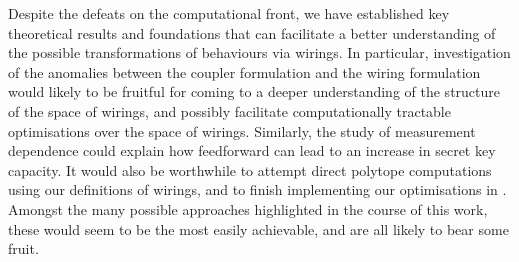 \documentclass[10pt, a4paper]{article}
\numberwithin{equation}{section} %
\theoremstyle{definition}
\theoremstyle{plain}
\newcommand{\?}{\mathrel{?}} %
\begin{document}
                  Despite the defeats on the computational front, we have established key theoretical results and foundations that can facilitate a better understanding of the possible transformations of behaviours via wirings. In particular, investigation of the anomalies between the coupler formulation and the wiring formulation would likely to be fruitful for coming to a deeper understanding of the structure of the space of wirings, and possibly facilitate computationally tractable optimisations over the space of wirings. Similarly, the study of measurement dependence could explain how feedforward can lead to an increase in secret key capacity. It would also be worthwhile to attempt direct polytope computations using our definitions of wirings, and to finish implementing our optimisations in . Amongst the many possible approaches highlighted in the course of this work, these would seem to be the most easily achievable, and are all likely to bear some fruit.

                  \clearpage

                  \printbibliography{}
                  \clearpage
\end{document}
